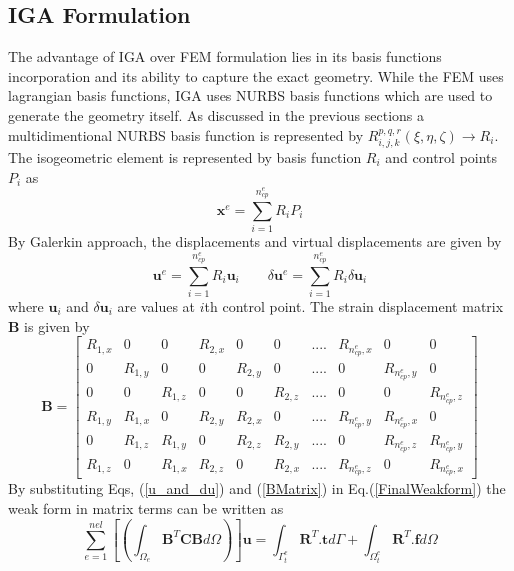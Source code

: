 \documentclass[12pt]{article}
\begin{document}
\subsection{IGA Formulation}
The advantage of IGA over FEM formulation lies in its basis functions incorporation and its ability to capture the exact geometry. While the FEM uses lagrangian basis functions, IGA uses NURBS basis functions which are used to generate the geometry itself. As discussed in the previous sections a multidimentional NURBS basis function is represented by $R_{i,j,k}^{p,q,r}(\xi,\eta,\zeta) \rightarrow R_i$. The isogeometric element  is represented by basis function $R_i$ and control points $P_i$ as
\begin{equation} \label{Co-ordinate}
\textbf{x}^e = \sum_{i=1}^{n_{cp}^e} R_i P_i
\end{equation} 
By Galerkin approach, the displacements and virtual displacements are given by
\begin{equation} \label{u_and_du}
\textbf{u}^e = \sum_{i=1}^{n_{cp}^e} R_i \textbf{u}_i \qquad \delta\textbf{u}^e = \sum_{i=1}^{n_{cp}^e} R_i \delta\textbf{u}_i
\end{equation}
where $\textbf{u}_i$ and $\delta\textbf{u}_i$ are values at $i$th control point.
The strain displacement matrix \textbf{B} is given by
\begin{equation} \label{BMatrix}
\textbf{B} =
\begin{bmatrix}
R_{1,x} & 0 & 0 & R_{2,x} & 0 & 0 & .... & R_{n_{cp}^e,x} & 0 & 0 \\
0 &R_{1,y} & 0 & 0 & R_{2,y} & 0 & .... & 0 & R_{n_{cp}^e,y} & 0  \\
0 & 0 & R_{1,z} &0 & 0 & R_{2,z} & .... &0 & 0 & R_{n_{cp}^e,z}  \\
R_{1,y} & R_{1,x} & 0 & R_{2,y} & R_{2,x} & 0 & .... & R_{n_{cp}^e,y} & R_{n_{cp}^e,x} & 0 \\
0 & R_{1,z} & R_{1,y} & 0 & R_{2,z} & R_{2,y} & .... & 0 & R_{n_{cp}^e,z} & R_{n_{cp}^e,y}\\
R_{1,z} &0 & R_{1,x} & R_{2,z} &0 & R_{2,x} & .... &R_{n_{cp}^e,z} &0 &R_{n_{cp}^e,x}
\end{bmatrix}
\end{equation}
By substituting Eqs, (\ref{u_and_du}) and (\ref{BMatrix}) in Eq.(\ref{FinalWeakform}) the weak form in matrix terms can be written as
\begin{equation} \label{MatrixWeakForm}
\sum_{e=1}^{nel} \left[ \left( \int_{\Omega_e} \textbf{B}^T \textbf{C} \textbf{B} d\Omega \right) \right] \textbf{u} = \int_{\Gamma^e_t} \textbf{R}^T.\textbf{t} d\Gamma + \int_{\Omega^e_t} \textbf{R}^T.\textbf{f} d\Omega 
\end{equation}
\end{document}
